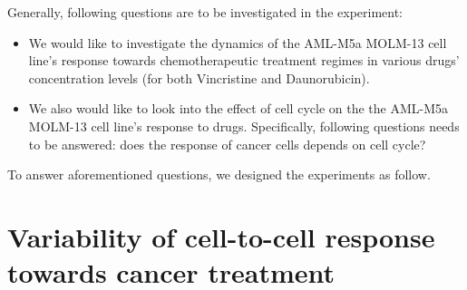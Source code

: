\documentclass[pdftex,12pt,a4paper]{report}
\begin{document}

Generally, following questions are to be investigated in the experiment:

\begin{itemize}
\item We would like to investigate the dynamics of the AML-M5a MOLM-13 cell line's response towards chemotherapeutic treatment regimes in various drugs' concentration levels (for both Vincristine and Daunorubicin).
\item We also would like to look into the effect of cell cycle on the the AML-M5a MOLM-13 cell line's response to drugs. Specifically, following questions needs to be answered: does the response of cancer cells depends on cell cycle?
\end{itemize}

To answer aforementioned questions, we designed the experiments as follow.

\section{Variability of cell-to-cell response towards cancer treatment}

\end{document}
